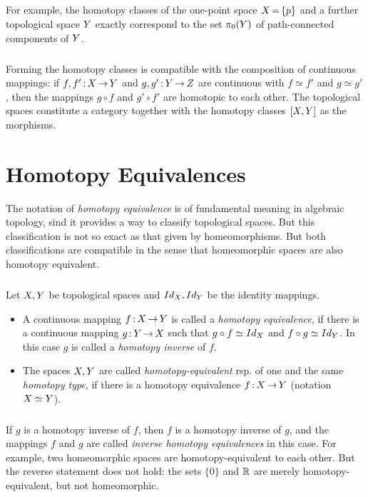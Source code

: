 \documentclass[11pt,twoside]{article}
\begin{document}
\subparagraph{}
For example,
the homotopy classes of the one-point space $X {\,=\,} \{p\}$
and a further topological space $Y$ exactly correspond
to the set $\pi_0(Y)$ of path-connected components of $Y$.

\subparagraph{}
Forming the homotopy classes is compatible
with the composition of continuous mappings:
if $f,f'{\,:\,}X {\,\to\,} Y$ and $g,g'{\,:\,}Y {\,\to\,} Z$
are continuous with $f \simeq f'$ and $g \simeq g'$,
then the mappings $g \circ f$ and $g' \circ f'$ are homotopic to each other.
The topological spaces constitute a category
together with the homotopy classes $[X,Y]$ as the morphisms.

\section{Homotopy Equivalences}
The notation of \textit{homotopy equivalence} is of fundamental meaning
in algebraic topology,
sind it provides a way to classify topological spaces.
But this classification is not so exact as that given by homeomorphisms.
But both classifications are compatible in the sense
that homeomorphic spaces are also homotopy equivalent.

\subparagraph{}
Let $X,Y$ be topological spaces and $Id_{X}, Id_{Y}$
be the identity mappings.

\begin{itemize}[leftmargin=22pt]
\item[1.]
A continuous mapping $f {\,:\,} X {\,\to\,} Y$ is called
a \textit{homotopy equivalence},
if there is a continuous mapping $g {\,:\,}Y {\,\to\,} X$
such that
$g \circ f \simeq Id_{X}$ and $f \circ g \simeq Id_{Y}$.
In this case $g$ is called a \textit{homotopy inverse} of $f$.

\item[2.]
The spaces $X,Y$ are called \textit{homotopy-equivalent} rsp.
of one and the same \textit{homotopy type},
if there is a homotopy equivalence $f{\,:\,}X {\,\to\,} Y$ 
(notation $X \simeq Y$).
\end{itemize}

\subparagraph{}
If $g$ is a homotopy inverse of $f$,
then $f$ is a homotopy inverse of $g$,
and the mappings $f$ and $g$ are called 
\textit{inverse homotopy equivalences} in this case.
For example,
two homeomorphic spaces are homotopy-equivalent to each other.
But the reverse statement does not hold:
the sets $\{0\}$ and ${\mathbb{R}}$ are merely homotopy-equivalent,
but not homeomorphic.
\end{document}
